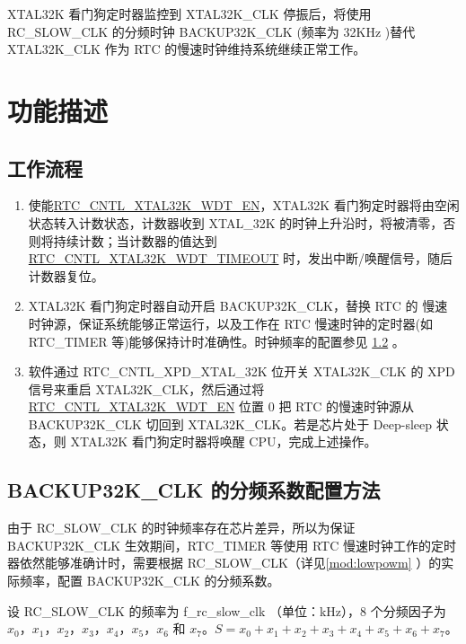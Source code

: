 \documentclass[main\_\_CN.tex]{subfiles}
\begin{document}
XTAL32K 看门狗定时器监控到 XTAL32K\_CLK 停振后，将使用 RC\_SLOW\_CLK 的分频时钟
BACKUP32K\_CLK (频率为 32KHz )替代 XTAL32K\_CLK 作为 RTC 的慢速时钟维持系统继续正常工作。

\section{功能描述}

\subsection{工作流程}

\begin{enumerate}
    \item 使能\hyperref[fielddesc:RTCCNTLXTAL32KWDTEN]{RTC\_CNTL\_XTAL32K\_WDT\_EN}，XTAL32K 看门狗定时器将由空闲状态转入计数状态，计数器收到 XTAL\_32K 的时钟上升沿时，将被清零，否则将持续计数；当计数器的值达到 \hyperref[fielddesc:RTCCNTLXTAL32KWDTTIMEOUT]{RTC\_CNTL\_XTAL32K\_WDT\_TIMEOUT} 时，发出中断/唤醒信号，随后计数器复位。
    \item XTAL32K 看门狗定时器自动开启 BACKUP32K\_CLK，替换 RTC 的 慢速时钟源，保证系统能够正常运行，以及工作在 RTC 慢速时钟的定时器(如 RTC\_TIMER 等)能够保持计时准确性。时钟频率的配置参见 \ref{subsubsection:divisor_configuration} \textit{}。
    \item 软件通过 RTC\_CNTL\_XPD\_XTAL\_32K 位开关 XTAL32K\_CLK 的 XPD 信号来重启 XTAL32K\_CLK，然后通过将 \hyperref[fielddesc:RTCCNTLXTAL32KWDTEN]{RTC\_CNTL\_XTAL32K\_WDT\_EN} 位置 0 把 RTC 的慢速时钟源从 BACKUP32K\_CLK 切回到 XTAL32K\_CLK。若是芯片处于 Deep-sleep 状态，则 XTAL32K 看门狗定时器将唤醒 CPU，完成上述操作。
\end{enumerate}

\subsection{BACKUP32K\_CLK 的分频系数配置方法}\label{subsubsection:divisor_configuration}

由于 RC\_SLOW\_CLK 的时钟频率存在芯片差异，所以为保证 BACKUP32K\_CLK 生效期间，RTC\_TIMER 等使用 RTC 慢速时钟工作的定时器依然能够准确计时，需要根据 RC\_SLOW\_CLK（详见\ref{mod:lowpowm} \textit{}）的实际频率，配置 BACKUP32K\_CLK 的分频系数。

设 RC\_SLOW\_CLK 的频率为 f\_rc\_slow\_clk （单位：kHz），8 个分频因子为 \begin{math} x_0，x_1，x_2，x_3，x_4，x_5，x_6 \end{math} 和 \begin{math}x_7\end{math}。\begin{math}S = x_0 + x_1 + x_2 + x_3 + x_4 + x_5 + x_6 + x_7\end{math}。
\end{document}
